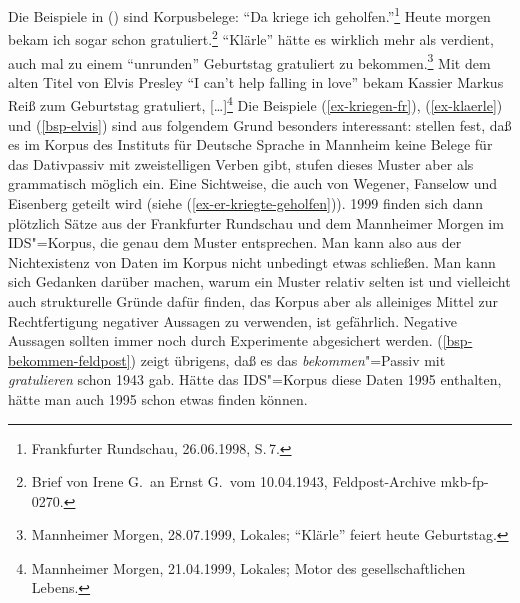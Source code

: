 \noindent
Die Beispiele in () sind Korpusbelege:
\eal
\ex\label{ex-kriegen-fr} "`Da kriege ich geholfen."'\footnote{
Frankfurter Rundschau, 26.06.1998, S.\,7.%
}
\ex\label{bsp-bekommen-feldpost}
Heute morgen bekam ich sogar schon gratuliert.\footnote{%
Brief von Irene G.\ an Ernst G.\ vom 10.04.1943, Feldpost-Archive mkb-fp-0270.}
\ex\label{ex-klaerle} 
"`Klärle"' hätte es wirklich mehr als verdient, auch mal zu einem "`unrunden"' Geburtstag gratuliert zu bekommen.\footnote{
Mannheimer Morgen, 28.07.1999, Lokales; "`Klärle"' feiert heute Geburtstag.%
}
\ex\label{bsp-elvis}
Mit dem alten Titel von Elvis Presley "`I can't help falling in love"' bekam Kassier Markus Reiß zum Geburtstag gratuliert, [\ldots]\footnote{
Mannheimer Morgen, 21.04.1999, Lokales; Motor des gesellschaftlichen Lebens.%
}
\zl
Die Beispiele (\ref{ex-kriegen-fr}), (\ref{ex-klaerle}) und (\ref{bsp-elvis}) 
sind aus folgendem Grund besonders interessant:\label{frequenz-von-korpusbelegen}
\citet{HW95a} stellen fest, daß es im Korpus des Instituts für Deutsche Sprache in Mannheim keine
Belege für das Dativpassiv mit zweistelligen Verben gibt, stufen dieses Muster aber als grammatisch
möglich ein. Eine Sichtweise, die auch von Wegener, Fanselow und Eisenberg geteilt wird (siehe (\ref{ex-er-kriegte-geholfen})).
1999 finden sich dann plötzlich Sätze aus der Frankfurter Rundschau und dem Mannheimer Morgen im IDS"=Korpus, die genau dem Muster 
entsprechen. Man kann also aus der Nichtexistenz von Daten im Korpus nicht unbedingt etwas schließen. Man kann sich
Gedanken darüber machen, warum ein Muster relativ selten ist und vielleicht auch strukturelle
Gründe dafür finden, das Korpus aber als alleiniges Mittel zur Rechtfertigung negativer
Aussagen zu verwenden, ist gefährlich. Negative Aussagen sollten immer noch durch Experimente abgesichert
werden. (\ref{bsp-bekommen-feldpost}) zeigt übrigens, daß es das \emph{bekommen}"=Passiv mit \emph{gratulieren} 
schon 1943 gab. Hätte das IDS"=Korpus diese Daten 1995 enthalten, hätte man auch 1995 schon etwas finden können.

